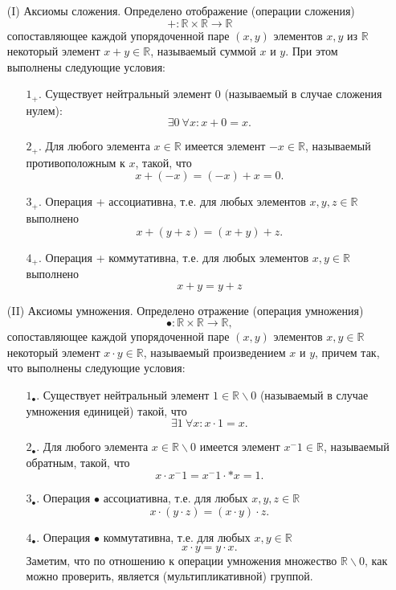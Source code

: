 \documentclass[a4paper, 12pt]{extarticle} %
\begin{document}
\begin{enumerate}
    \item [(I)] Аксиомы сложения. Определено отображение (операции сложения)
          $$ + : \mathbb{R} \times \mathbb{R} \to \mathbb{R} $$
          сопоставляющее каждой упорядоченной паре $(x, y)$ элементов $x, y$ из $\mathbb{R}$ некоторый элемент $x+y \in \mathbb{R}$, называемый суммой $x$ и $y$. При этом выполнены следующие условия:
          \begin{enumerate}
              \item [$1_+.$] Существует нейтральный элемент 0 (называемый в случае сложения нулем):
                    $$ \exists 0 \ \forall x: x + 0 = x. $$
              \item [$2_+.$] Для любого элемента $x \in \mathbb{R}$ имеется элемент $-x \in \mathbb{R}$, называемый противоположным к $x$, такой, что
                    $$ x + (-x) = (-x) + x = 0. $$
              \item [$3_+.$] Операция + ассоциативна, т.е. для любых элементов $x, y, z \in \mathbb{R}$ выполнено $$ x + (y + z) = (x + y) + z. $$
              \item [$4_+.$] Операция + коммутативна, т.е. для любых элементов $x, y \in \mathbb{R}$ выполнено $$ x + y = y + z $$
          \end{enumerate}
    \item [(II)] Аксиомы умножения. Определено отражение (операция умножения) $$ \bullet : \mathbb{R} \times \mathbb{R} \to \mathbb{R}, $$ сопоставляющее каждой упорядоченной паре $(x, y)$ элементов $x, y \in \mathbb{R}$ некоторый элемент $x \cdot y \in \mathbb{R}$, называемый произведением $x$ и $y$, причем так, что выполнены следующие условия:
          \begin{enumerate}
              \item [$1_\bullet.$] Существует нейтральный элемент $1 \in \mathbb{R} \backslash 0$ (называемый в случае умножения единицей) такой, что $$ \exists 1 \ \forall x: x \cdot 1 = x.$$
              \item [$2_\bullet.$] Для любого элемента $x \in \mathbb{R} \backslash 0$ имеется элемент $x^-1 \in \mathbb{R}$, называемый обратным, такой, что $$ x \cdot x^-1 = x^-1 \cdot * x = 1.$$
              \item [$3_\bullet.$] Операция $\bullet$ ассоциативна, т.е. для любых $x, y, z \in \mathbb{R}$ $$ x \cdot (y \cdot z) = (x \cdot y) \cdot z.$$
              \item [$4_\bullet.$] Операция $\bullet$ коммутативна, т.е. для любых $x, y \in \mathbb{R}$ $$ x \cdot y = y \cdot x.$$
                    Заметим, что по отношению к операции умножения множество $\mathbb{R} \backslash 0$, как можно проверить, является (мультипликативной) группой.
          \end{enumerate}
\end{enumerate}
\end{document}
